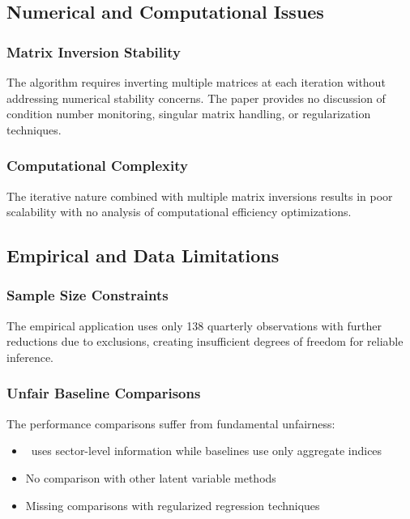 \documentclass[12pt,letterpaper]{article}
\newcommand{\clarx}{\text{(C)LARX}}
\begin{document}
\subsection{Numerical and Computational Issues}

\subsubsection{Matrix Inversion Stability}

The algorithm requires inverting multiple matrices at each iteration without addressing numerical stability concerns. The paper provides no discussion of condition number monitoring, singular matrix handling, or regularization techniques.

\subsubsection{Computational Complexity}

The iterative nature combined with multiple matrix inversions results in poor scalability with no analysis of computational efficiency optimizations.

\subsection{Empirical and Data Limitations}

\subsubsection{Sample Size Constraints}

The empirical application uses only 138 quarterly observations with further reductions due to exclusions, creating insufficient degrees of freedom for reliable inference.

\subsubsection{Unfair Baseline Comparisons}

The performance comparisons suffer from fundamental unfairness:
\begin{itemize}
\item \clarx\ uses sector-level information while baselines use only aggregate indices
\item No comparison with other latent variable methods
\item Missing comparisons with regularized regression techniques
\end{itemize}
\end{document}
